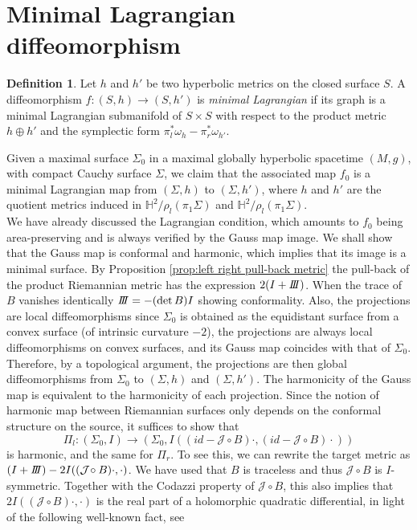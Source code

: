 \documentclass[10pt,a4paper,oneside,reqno]{book}
\def\H{\mathbb{H}}
\newcommand{\I}{I}
\newcommand{\III}{I\hspace{-0.1cm}I\hspace{-0.1cm}I}
\newcommand{\JJ}{\mathcal{J}\!}
\theoremstyle{plain}
\theoremstyle{definition}
\newtheorem{definition}[theorem]{Definition} %
\theoremstyle{plain}
\theoremstyle{plain}
\theoremstyle{mystyleNormalFont}
\begin{document}
\section{Minimal Lagrangian diffeomorphism}

\begin{definition}
    Let $h$ and $h'$ be two hyperbolic metrics on the closed surface $S$. A diffeomorphism $f: (S,h) \to (S,h')$ is \textit{minimal Lagrangian} if its graph is a minimal Lagrangian submanifold of $S\times S$ with respect to the product metric $h \oplus h'$ and the symplectic form $\pi_l^*\omega_h - \pi_r^* \omega_{h'}$. 
\end{definition}
Given a maximal surface $\Sigma_0$ in a maximal globally hyperbolic spacetime $(M,g)$, with compact Cauchy surface $\Sigma$, we claim that the associated map $f_0$ is a minimal Lagrangian map from $(\Sigma,h)$ to $(\Sigma,h')$, where $h$ and $h'$ are the quotient metrics induced in $\H^2/\rho_l(\pi_1\Sigma)$ and $\H^2/\rho_l(\pi_1\Sigma)$.\\
We have already discussed the Lagrangian condition, which amounts to $f_0$ being area-preserving and is always verified by the Gauss map image.
We shall show that the Gauss map is conformal and harmonic, which implies that its image is a minimal surface. 
By Proposition \ref{prop:left right pull-back metric} the pull-back of the product Riemannian metric has the expression $2(\I+\III)$.
When the trace of $B$ vanishes identically $\III=-(\det B)\I$ showing conformality. Also, the projections are local diffeomorphisms since $\Sigma_0$ is obtained as the equidistant surface from a convex surface (of intrinsic curvature $-2$), the projections are always local diffeomorphisms on convex surfaces, and its Gauss map coincides with that of $\Sigma_0$. Therefore, by a topological argument, the projections are then global diffeomorphisms from $\Sigma_0$ to $(\Sigma,h)$ and $(\Sigma,h')$.
The harmonicity of the Gauss map is equivalent to the harmonicity of each projection. Since the notion of harmonic map between Riemannian surfaces only depends on the conformal structure on the source, it suffices to show that 
$$\Pi_l:(\Sigma_0,\I)\to (\Sigma_0,\I((id-\JJ\circ B)\cdot,(id-\JJ\circ B)\cdot))$$ is harmonic, and the same for $\Pi_r$. To see this,  we can rewrite the target metric as $(\I+\III)-2\I((\JJ\circ B)\cdot,\cdot)$. We have used that $B$ is traceless and thus $\JJ\circ B$ is $\I$-symmetric. Together with the Codazzi property of $\JJ\circ B$, this also implies that  $2\I((\JJ\circ B)\cdot,\cdot)$ is the real part of a holomorphic quadratic differential, in light of the following well-known fact, see
 
\end{document}
